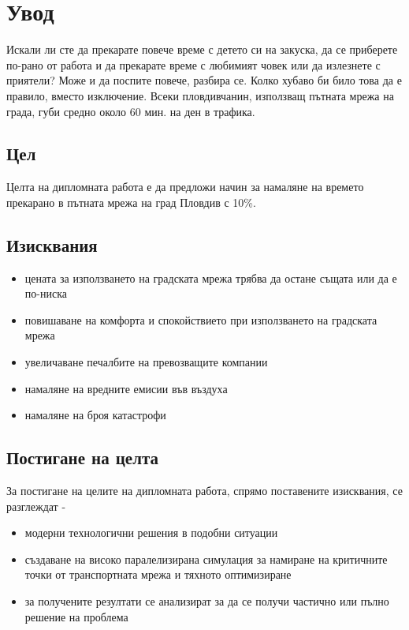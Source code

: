 \chapter{Увод}

	Искали ли сте да прекарате повече време с детето си на закуска, 
	да се приберете по-рано от работа и да прекарате време с любимият човек или да излезнете с приятели? 
	Може и да поспите повече, разбира се. Колко хубаво би било това да е правило, вместо изключение.
	Всеки пловдивчанин, използващ пътната мрежа на града, губи средно около 60 мин. на ден в трафика.

	\section{Цел}

	Целта на дипломната работа е да предложи начин за намаляне на времето прекарано в пътната мрежа на град Пловдив с 10\%. 

	\section{Изисквания}

		\begin{itemize}
			\item цената за използването на градската мрежа трябва да остане същата или да е по-ниска
			\item повишаване на комфорта и спокойствието при използването на градската мрежа
			\item увеличаване печалбите на превозващите компании
			\item намаляне на вредните емисии във въздуха
			\item намаляне на броя катастрофи
		\end{itemize}

	\section{Постигане на целта}

		За постигане на целите на дипломната работа, спрямо поставените изисквания, се разглеждат - 
	
		\begin{itemize}
			\item модерни технологични решения в подобни ситуации
			\item създаване на високо паралелизирана симулация за намиране на критичните точки от транспортната мрежа и тяхното оптимизиране
			\item за получените резултати се анализират за да се получи частично или пълно решение на проблема
		\end{itemize}

